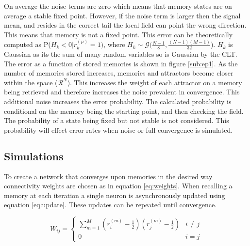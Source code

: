 \documentclass[twoside,twocolumn]{article}
\begin{document}
On average the noise terms are zero which means that memory states are on average a stable fixed point. However, if the noise term is larger then the signal mean, and resides in the correct tail the local field can point the wrong direction. This means that memory is not a fixed point. This error can be theoretically computed as P($H_k<0|r_k^{(\mu)}=1)$, where $H_k \sim \mathcal{G}(\frac{N-1}{8},\frac{(N-1)(M-1)}{32}$). $H_k$ is Gaussian as its the sum of many random variables so is Gaussian by the CLT. The error as a function of stored memories is shown in figure \ref{sub:ep1}.
\newline
As the number of memories stored increases, memories and attractors become closer within the space ($\mathcal{R}^N$). This increases the weight of each attractor on a memory being retrieved and therefore increases the noise prevalent in convergence. This additional noise increases the error probability.
\newline
The calculated probability is conditional on the memory being the starting point, and then checking the field. The probability of a state being fixed but not stable is not considered. This probability will effect error rates when noise or full convergence is simulated.
\subsection{ Simulations}
To create a network that converges upon memories in the desired way connectivity weights are chosen as in equation \ref{eq:weights}. When recalling a memory at each iteration a single neuron is asynchronously updated using equation \ref{eq:update}. These updates can be repeated until convergence.

\begin{equation}
W_{ij} =
\left\{
	\begin{array}{ll}
		\sum\limits^M_{m=1}(r_i^{(m)}-\frac{1}{2})(r_j^{(m)}-\frac{1}{2})  &  i \neq j \\
		0 & i=j
	\end{array}
\right.
\label{eq:weights}
\end{equation}
\end{document}
